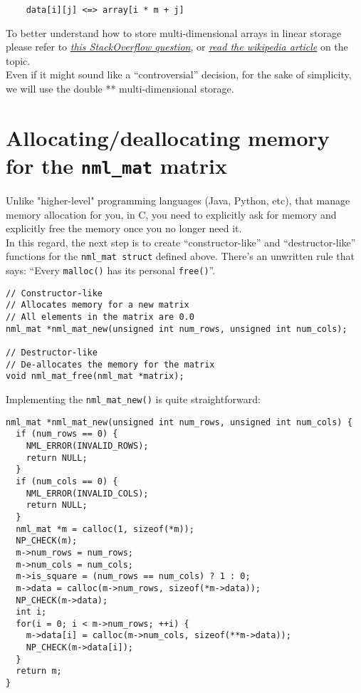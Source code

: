 \begin{verbatim}
    data[i][j] <=> array[i * m + j]
\end{verbatim}

To better understand how to store multi-dimensional arrays in linear storage please refer to \href{https://stackoverflow.com/questions/14015556/how-to-map-the-indexes-of-a-matrix-to-a-1-dimensional-array-c}{\underline{\it this StackOverflow question}}, or \href{https://en.wikipedia.org/wiki/Row-_and_column-major_order}{\underline{\it read the wikipedia article}} on the topic.
\\

Even if it might sound like a “controversial” decision, for the sake of simplicity, we will use the double ** multi-dimensional storage.

\section{Allocating/deallocating memory for the {\tt nml\_mat} matrix}

Unlike "higher-level" programming languages (Java, Python, etc), that manage memory allocation for you, in C, you need to explicitly ask for memory and explicitly free the memory once you no longer need it.
\\

In this regard, the next step is to create ``constructor-like'' and “destructor-like” functions for the {\tt nml\_mat struct} defined above. There’s an unwritten rule that says: ``Every {\tt malloc()} has its personal {\tt free()}''.

\begin{verbatim}
// Constructor-like 
// Allocates memory for a new matrix
// All elements in the matrix are 0.0
nml_mat *nml_mat_new(unsigned int num_rows, unsigned int num_cols);

// Destructor-like
// De-allocates the memory for the matrix
void nml_mat_free(nml_mat *matrix);
\end{verbatim}

Implementing the {\tt nml\_mat\_new()} is quite straightforward:

\begin{verbatim}
nml_mat *nml_mat_new(unsigned int num_rows, unsigned int num_cols) {
  if (num_rows == 0) {
    NML_ERROR(INVALID_ROWS);
    return NULL;
  }
  if (num_cols == 0) {
    NML_ERROR(INVALID_COLS);
    return NULL;
  }
  nml_mat *m = calloc(1, sizeof(*m));
  NP_CHECK(m);
  m->num_rows = num_rows;
  m->num_cols = num_cols;
  m->is_square = (num_rows == num_cols) ? 1 : 0;
  m->data = calloc(m->num_rows, sizeof(*m->data));
  NP_CHECK(m->data);
  int i;
  for(i = 0; i < m->num_rows; ++i) {
    m->data[i] = calloc(m->num_cols, sizeof(**m->data));
    NP_CHECK(m->data[i]);
  }
  return m;
}
\end{verbatim}

